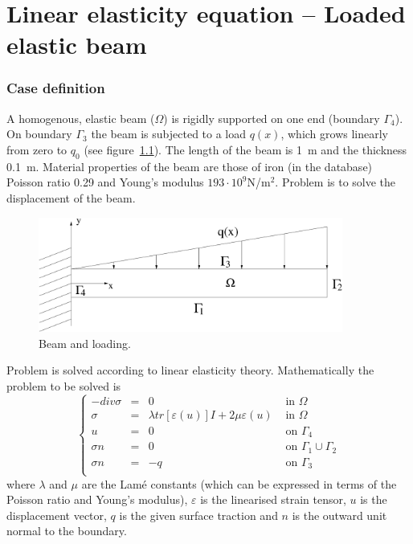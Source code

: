 \chapter{Linear elasticity equation -- Loaded elastic beam}



\subsection*{Case definition}

A homogenous, elastic beam ($\Omega$) is rigidly supported on one 
end (boundary $\Gamma_4$). On boundary $\Gamma_3$ the beam is subjected 
to a load $q(x)$, which grows linearly from zero to $q_0$ 
(see figure~\ref{fg:beam}). The length of the beam is 1~m and the thickness 0.1~m.
Material properties of the beam are those of iron (in the database) Poisson 
ratio 0.29 and Young's modulus $193\cdot 10^9$N/m$^2$. Problem is to solve the 
displacement of the beam.  

\begin{figure}[h]
\centering
\includegraphics[width=100mm]{Beam}
\caption{Beam and loading.}\label{fg:beam}
\end{figure}

Problem is solved according to linear elasticity theory. Mathematically 
the problem to be solved is
\begin{equation}
\left \{
\begin{array}{rcll}
-div \sigma & = & 0 & \mbox{ in } \Omega \\
\sigma & = & \lambda tr [\varepsilon(u)]I + 2 \mu \varepsilon(u) &
\mbox{ in } \Omega \\
u & = & 0 & \mbox{ on } \Gamma_4 \\
\sigma n & = & 0 & \mbox{ on } \Gamma_1 \cup \Gamma_2 \\
\sigma n & = & -q & \mbox{ on } \Gamma_3 \\
\end{array}
\right .
\end{equation}
where $\lambda$ and $\mu$ are the Lam\'{e} constants (which can be expressed 
in terms of the Poisson ratio and Young's modulus), $\varepsilon$ is the 
linearised strain tensor, $u$ is the displacement vector, $q$ is the given
surface traction and $n$ is the outward unit normal to the boundary.



